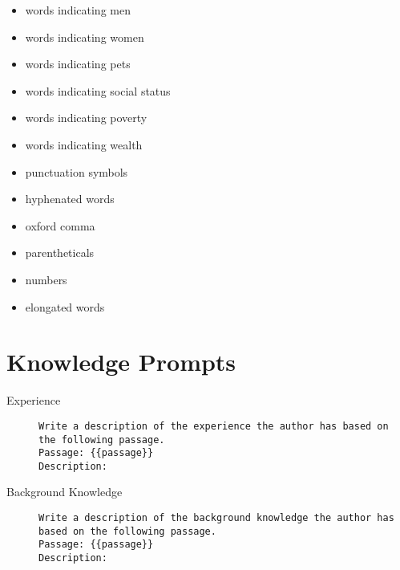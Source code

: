 \begin{multicols}{2}
\begin{itemize}[nolistsep]
    \item words indicating men
    \item words indicating women
    \item words indicating pets
    \item words indicating social status
    \item words indicating poverty
    \item words indicating wealth
    \item punctuation symbols
    \item hyphenated words
    \item oxford comma
    \item parentheticals
    \item numbers
    \item elongated words
  \end{itemize}
\end{multicols}

\section{Knowledge Prompts}
\label{sec:appendix:knowledgePrompts}
\begin{description}
  \item[Experience]\leavevmode \newline
        \begin{minipage}{\linewidth}
          \begin{lstlisting}
Write a description of the experience the author has based on the following passage.
Passage: {{passage}}
Description:
\end{lstlisting}
        \end{minipage}
  \item[Background Knowledge]\leavevmode \newline
        \begin{minipage}{\linewidth}
          \begin{lstlisting}
Write a description of the background knowledge the author has based on the following passage.
Passage: {{passage}}
Description:
\end{lstlisting}
        \end{minipage}
\end{description}
